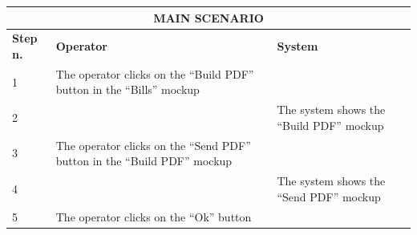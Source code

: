 {{{\begin{center}
			\begin{tabular}{|p{2cm}|p{6cm}|p{6cm}|}
			\hline
				\multicolumn{3}{|c|}{MAIN SCENARIO}\\
			\hline
				\centering \vspace{1mm} \bfseries{Step n.} \vspace{1mm} & \vspace{1mm} \bfseries{Operator} \vspace{1mm} & \vspace{1mm} \bfseries{System} \vspace{1mm}\\
			\hline
				\vspace{1mm} 1 \vspace{1mm} &
				\vspace{1mm} The operator clicks on the “Build PDF” button in the “Bills” mockup\vspace{1mm} & 
				\vspace{1mm} \vspace{1mm} \\
			\hline
				\vspace{1mm} 2 \vspace{1mm} &
				\vspace{1mm} \vspace{1mm} & 
				\vspace{1mm} The system shows the “Build PDF” mockup\vspace{1mm} \\
			\hline
				\vspace{1mm} 3\vspace{1mm} &
				\vspace{1mm} The operator clicks on the “Send PDF” button in the “Build PDF” mockup\vspace{1mm} & 
				\vspace{1mm} \vspace{1mm} \\
			\hline
				\vspace{1mm} 4\vspace{1mm} &
				\vspace{1mm} \vspace{1mm} & 
				\vspace{1mm} The system shows the “Send PDF” mockup\vspace{1mm} \\
			\hline
				\vspace{1mm} 5\vspace{1mm} &
				\vspace{1mm} The operator clicks on the “Ok” button\vspace{1mm} & 

\end{tabular}
\end{center}}}}
